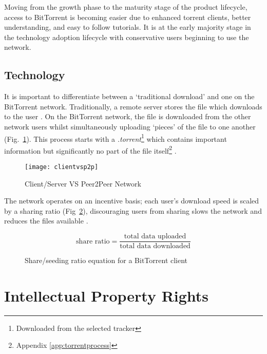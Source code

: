 Moving from the growth phase to the maturity stage of the product lifecycle, access to BitTorrent is becoming easier due to enhanced torrent \glspl{client}, better understanding, and easy to follow tutorials. It is at the early majority stage in the technology adoption lifecycle with conservative users beginning to use the network. 



\subsection{Technology}

It is important to differentiate between a `traditional download' and one on the BitTorrent network. Traditionally, a remote server stores the file which downloads to the user \citep[Chapter 7.]{reese2000java}.
%
On the BitTorrent network, the file is downloaded from the other network users whilst simultaneously uploading `pieces' of the file to one another \citep{bittorrentrobustness2003} (Fig.~\ref{fig:clientVSp2p}).
% 
This process starts with a \textit{.torrent}\footnote{Downloaded from the selected tracker} which contains important information but significantly no part of the file itself\footnote{Appendix \ref{app:torrentprocess}} \citep{bittorrentrobustness2003}. 


\begin{figure}[h]
    \centering
    \texttt{[image: clientvsp2p]}
    \caption{Client/Server VS Peer2Peer Network \citep{gogrid}}
    \label{fig:clientVSp2p}
\end{figure}

The network operates on an incentive basis; each user's download speed is scaled by a sharing ratio (Fig~\ref{figure:scaling}), discouraging users from sharing slows the network and reduces the files available \citep{bittorrentrobustness2003}.

\begin{figure}[h]
    \centering
    
    \[ \mbox{share ratio} = \frac{\mbox{total data uploaded}}{\mbox{total data downloaded}} \]
    
    \caption{Share/seeding ratio equation for a BitTorrent client \citep{bittorrentrobustness2003}}
    \label{figure:scaling}
\end{figure}

\section{Intellectual Property Rights}


